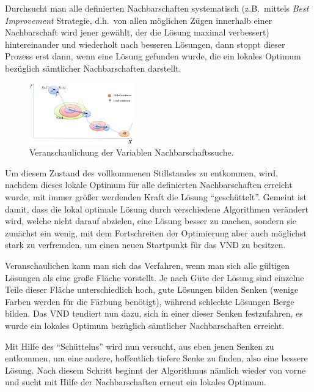 \documentclass[paper=a4,fontsize=12pt]{scrartcl}
\begin{document}
Durchsucht man alle definierten Nachbarschaften systematisch (z.B.\ mittels \emph{Best Improvement} Strategie, d.h.\ von allen möglichen Zügen innerhalb einer Nachbarschaft wird jener gewählt, der die Lösung maximal verbessert) hintereinander und wiederholt nach besseren Lösungen, dann stoppt dieser Prozess erst dann, wenn eine Lösung gefunden wurde, die ein lokales Optimum bezüglich sämtlicher Nachbarschaften darstellt.

\begin{figure}
\vspace{-8mm}
\begin{center}
\includegraphics[width=0.4\textwidth]{../img/vns.jpg}
\end{center}
\vspace{-8mm}
\caption{Veranschaulichung der Variablen Nachbarschaftssuche. \cite{Chen}}
\vspace{-8mm}
\end{figure}

Um diesem Zustand des vollkommenen Stillstandes zu entkommen, wird, nachdem dieses lokale Optimum für alle definierten Nachbarschaften erreicht wurde, mit immer größer werdenden Kraft die Lösung ``geschüttelt''. Gemeint ist damit, dass die lokal optimale Lösung durch verschiedene Algorithmen verändert wird, welche nicht darauf abzielen, eine Lösung besser zu machen, sondern sie zunächst ein wenig, mit dem Fortschreiten der Optimierung aber auch möglichst stark zu verfremden, um einen neuen Startpunkt für das VND zu besitzen.

Veranschaulichen kann man sich das Verfahren, wenn man sich alle gültigen Lösungen als eine große Fläche vorstellt. Je nach Güte der Lösung sind einzelne Teile dieser Fläche unterschiedlich hoch, gute Lösungen bilden Senken (wenige Farben werden für die Färbung benötigt), während schlechte Lösungen Berge bilden. Das VND tendiert nun dazu, sich in einer dieser Senken festzufahren, es wurde ein lokales Optimum bezüglich sämtlicher Nachbarschaften erreicht.

Mit Hilfe des ``Schüttelns'' wird nun versucht, aus eben jenen Senken zu entkommen, um eine andere, hoffentlich tiefere Senke zu finden, also eine bessere Lösung. Nach diesem Schritt beginnt der Algorithmus nämlich wieder von vorne und sucht mit Hilfe der Nachbarschaften erneut ein lokales Optimum.
\end{document}
